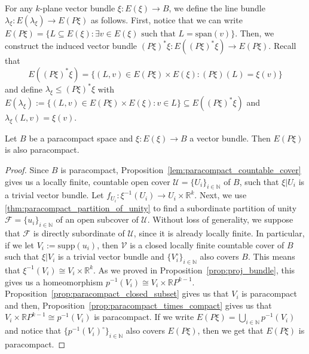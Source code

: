 \begin{definition} For any $k$-plane vector bundle $\xi:E(\xi)\to B$, we define the line bundle $\lambda_{\xi}:E(\lambda_\xi)\to E(P\xi)$ as follows. First, notice that we can write $E(P\xi)=\big\{L\subseteq E(\xi):\exists v\in E(\xi)\text{ such that }L=\mathrm{span}(v)\big\}$. Then, we construct the induced vector bundle $(P\xi)^*\xi:E((P\xi)^*\xi)\to E(P\xi)$. Recall that
\[E((P\xi)^*\xi)=\big\{(L,v)\in E(P\xi)\times E(\xi):(P\xi)(L)=\xi(v)\big\}\]
and define $\lambda_{\xi}\leq(P\xi)^*\xi$ with $E(\lambda_{\xi}):=\big\{(L,v)\in E(P\xi)\times E(\xi):v\in L\big\}\subseteq E((P\xi)^*\xi)$ and $\lambda_{\xi}(L,v)=\xi(v)$.
\begin{center}
\end{center}
\end{definition}

\begin{lemma}\label{lem:projective_paracompact} Let $B$ be a paracompact space and $\xi:E(\xi)\to B$ a vector bundle. Then $E(P\xi)$ is also paracompact.
\end{lemma}
\begin{proof} Since $B$ is paracompact, Proposition~\ref{lem:paracompact_countable_cover} gives us a locally finite, countable open cover $\mathcal{U}=\{U_i\}_{i\in\mathbb{N}}$ of $B$, such that $\xi|U_i$ is a trivial vector bundle. Let $f_{U_i}:\xi^{-1}(U_i)\to U_i\times\mathbb{R}^k$. Next, we use \ref{thm:paracompact_partition_of_unity} to find a subordinate partition of unity $\mathcal{F}=\{u_i\}_{i\in\mathbb{N}}$ of an open subcover of $\mathcal{U}$. Without loss of generality, we suppose that $\mathcal{F}$ is directly subordinate of $\mathcal{U}$, since it is already locally finite. In particular, if we let $V_i:=\mathrm{supp}(u_i)$, then $\mathcal{V}$ is a closed locally finite countable cover of $B$ such that $\xi|V_i$ is a trivial vector bundle and $\{V_i^{\circ}\}_{i\in\mathbb{N}}$ also covers $B$. This means that $\xi^{-1}(V_i)\cong V_i\times\mathbb{R}^k$. As we proved in Proposition~\ref{prop:proj_bundle}, this gives us a homeomorphism $p^{-1}(V_i)\cong V_i\times\mathbb{R}P^{k-1}$. Proposition~\ref{prop:paracompact_closed_subset} gives us that $V_i$ is paracompact and then, Proposition~\ref{prop:paracompact_times_compact} gives us that $V_i\times\mathbb{R}P^{k-1}\cong p^{-1}(V_i)$ is paracompact. If we write $E(P\xi)=\bigcup_{i\in\mathbb{N}}p^{-1}(V_i)$ and notice that $\{p^{-1}(V_i)^{\circ}\}_{i\in\mathbb{N}}$ also covers $E(P\xi)$, then we get that $E(P\xi)$ is paracompact.%
\end{proof}

